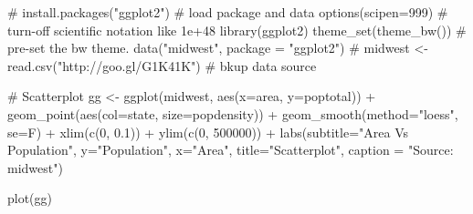 # install.packages("ggplot2")
# load package and data
options(scipen=999)  # turn-off scientific notation like 1e+48
library(ggplot2)
theme_set(theme_bw())  # pre-set the bw theme.
data("midwest", package = "ggplot2")
# midwest <- read.csv("http://goo.gl/G1K41K")  # bkup data source

# Scatterplot
gg <- ggplot(midwest, aes(x=area, y=poptotal)) + 
  geom_point(aes(col=state, size=popdensity)) + 
  geom_smooth(method="loess", se=F) + 
  xlim(c(0, 0.1)) + 
  ylim(c(0, 500000)) + 
  labs(subtitle="Area Vs Population", 
       y="Population", 
       x="Area", 
       title="Scatterplot", 
       caption = "Source: midwest")

plot(gg)
